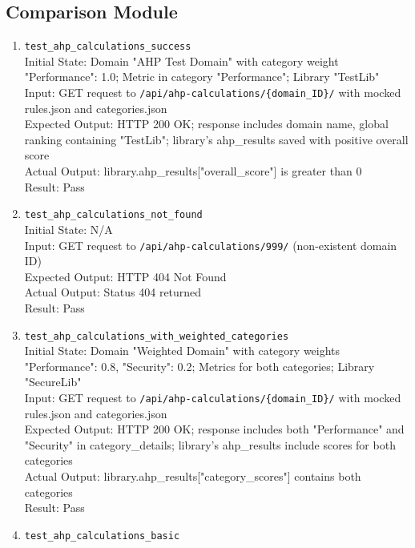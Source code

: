 \documentclass[12pt, titlepage]{article}
\begin{document}
\subsection{Comparison Module}
  \begin{enumerate}
    \item \texttt{test\_ahp\_calculations\_success} \label{test-ahp-calculations-success}
      \\Initial State: Domain "AHP Test Domain" with category weight {"Performance": 1.0}; Metric in category "Performance"; Library "TestLib"
      \\Input: GET request to \texttt{/api/ahp-calculations/\{domain\_ID\}/} with mocked rules.json and categories.json
      \\Expected Output: HTTP 200 OK; response includes domain name, global ranking containing "TestLib"; library's ahp\_results saved with positive overall score
      \\Actual Output: library.ahp\_results["overall\_score"] is greater than 0
      \\Result: Pass
    \item \texttt{test\_ahp\_calculations\_not\_found} \label{test-ahp-calculations-not-found}
      \\Initial State: N/A
      \\Input: GET request to \texttt{/api/ahp-calculations/999/} (non-existent domain ID)
      \\Expected Output: HTTP 404 Not Found
      \\Actual Output: Status 404 returned
      \\Result: Pass
    \item \texttt{test\_ahp\_calculations\_with\_weighted\_categories} \label{test-ahp-calculations-with-weighted-categories}
      \\Initial State: Domain "Weighted Domain" with category weights {"Performance": 0.8, "Security": 0.2}; Metrics for both categories; Library "SecureLib"
      \\Input: GET request to \texttt{/api/ahp-calculations/\{domain\_ID\}/} with mocked rules.json and categories.json
      \\Expected Output: HTTP 200 OK; response includes both "Performance" and "Security" in category\_details; library's ahp\_results include scores for both categories
      \\Actual Output: library.ahp\_results["category\_scores"] contains both categories
      \\Result: Pass
    \item \texttt{test\_ahp\_calculations\_basic} \label{test-ahp-calculations-basic}

\end{enumerate}
\end{document}
